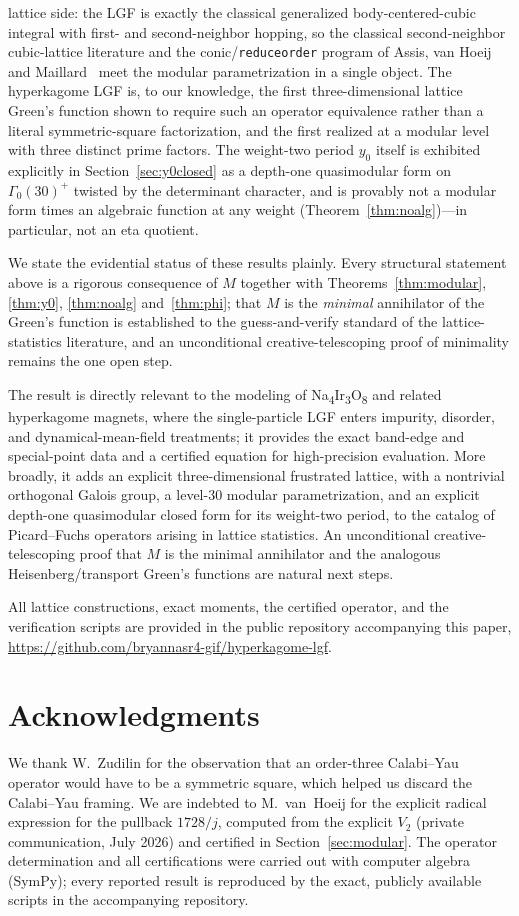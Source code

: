 \documentclass[11pt]{article}
\theoremstyle{plain}
\theoremstyle{remark}
\begin{document}
lattice side: the LGF is exactly the classical generalized body-centered-cubic integral with first- and
second-neighbor hopping, so the classical second-neighbor cubic-lattice literature and the
conic/\texttt{reduceorder} program of Assis, van Hoeij and Maillard~\cite{AVM2016} meet the modular
parametrization in a single object. The hyperkagome LGF is, to our knowledge, the first three-dimensional
lattice Green's function shown to require such an operator equivalence rather than a literal symmetric-square
factorization, and the first realized at a modular level with three distinct prime factors. The weight-two
period $y_0$ itself is exhibited explicitly in Section~\ref{sec:y0closed} as a depth-one quasimodular form on
$\Gamma_0(30)^+$ twisted by the determinant character, and is provably not a modular form times an algebraic
function at any weight (Theorem~\ref{thm:noalg})---in particular, not an eta quotient.

We state the evidential status of these results plainly. Every structural statement above is a rigorous
consequence of $M$ together with Theorems~\ref{thm:modular}, \ref{thm:y0}, \ref{thm:noalg}
and~\ref{thm:phi}; that $M$ is the \emph{minimal} annihilator of the Green's function is established to the
guess-and-verify standard of the lattice-statistics literature, and an unconditional creative-telescoping
proof of minimality remains the one open step.

The result is directly relevant to the modeling of Na\textsubscript{4}Ir\textsubscript{3}O\textsubscript{8} and related hyperkagome magnets, where the
single-particle LGF enters impurity, disorder, and dynamical-mean-field treatments; it provides the exact
band-edge and special-point data and a certified equation for high-precision evaluation. More broadly, it adds an
explicit three-dimensional frustrated lattice, with a nontrivial orthogonal Galois group, a level-30 modular
parametrization, and an explicit depth-one quasimodular closed form for its weight-two period, to the catalog
of Picard--Fuchs operators arising in lattice statistics. An unconditional creative-telescoping proof that $M$
is the minimal annihilator and the analogous Heisenberg/transport Green's functions are natural next steps.

All lattice constructions, exact moments, the certified operator, and the verification scripts are provided in
the public repository accompanying this paper,
\url{https://github.com/bryannasr4-gif/hyperkagome-lgf}.

\section*{Acknowledgments}
We thank W.~Zudilin for the observation that an order-three
Calabi--Yau operator would have to be a symmetric square, which helped us discard the Calabi--Yau framing.
We are indebted to M.~van~Hoeij for the explicit radical expression for the pullback $1728/j$, computed from
the explicit $V_2$ (private communication, July 2026) and certified in Section~\ref{sec:modular}.
The operator determination and all certifications were carried out with computer algebra (SymPy); every reported
result is reproduced by the exact, publicly available scripts in the accompanying repository.
\end{document}
